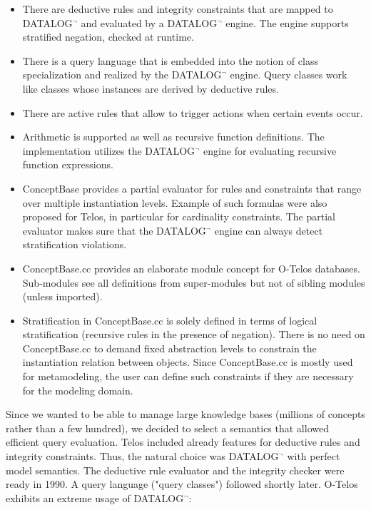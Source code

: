\begin{itemize}
\item There are deductive rules and integrity constraints that are mapped to DATALOG$^\neg$ and evaluated
by a DATALOG$^\neg$ engine.  The engine supports stratified negation, checked at runtime. 
\item There is a query language that is embedded into the notion of class specialization and
realized by the DATALOG$^\neg$ engine. Query classes work like classes whose instances are derived by 
deductive rules.
\item There are active rules that allow to trigger actions when certain events occur.
\item Arithmetic is supported as well as recursive function definitions. The implementation utilizes
the DATALOG$^\neg$ engine for evaluating recursive function expressions.
\item ConceptBase provides a partial evaluator for rules and constraints that range over 
multiple instantiation levels. Example of such formulas were also proposed for Telos, in particular
for cardinality constraints. The partial evaluator makes sure that the DATALOG$^\neg$ engine can always
detect stratification violations.
\item ConceptBase.cc provides an elaborate module concept for O-Telos databases. Sub-modules
see all definitions from super-modules but not of sibling modules (unless imported).
\item Stratification in ConceptBase.cc is solely defined in terms of logical stratification
(recursive rules in the presence of negation). There is no need on ConceptBase.cc to demand fixed
abstraction levels to constrain the instantiation relation between objects. Since ConceptBase.cc
is mostly used for metamodeling, the user can define such constraints if they are necessary for
the modeling domain.
\end{itemize}



Since we wanted to be able to manage large knowledge bases (millions of concepts rather than a few hundred), 
we decided to select a semantics that allowed efficient query evaluation. Telos included already features 
for deductive rules and integrity constraints. Thus, the natural choice was DATALOG$^\neg$ 
with perfect model semantics. The deductive rule evaluator and the integrity checker 
were ready in 1990. A query language ("query classes") followed shortly later. 
O-Telos exhibits an extreme usage of DATALOG$^\neg$:

